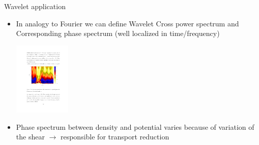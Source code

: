 \documentclass[t,10pt]{beamer}
\begin{document}
\begin{frame}{Wavelet application}

\begin{itemize}
\item In analogy to Fourier we can define Wavelet Cross power spectrum
  and Corresponding phase spectrum (well localized in time/frequency)

\begin{center}
\includegraphics[height=3.5cm]{wavelet-phase}
\end{center}

\item Phase spectrum between density and potential varies because of
  variation of the shear $\rightarrow$ responsible for transport
  reduction {\footnotesize\parencite{Antoni:2000bn}}

\end{itemize}
\end{frame}
\end{document}
